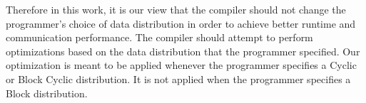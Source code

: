 Therefore in this work, it is our view that the compiler should not change the programmer's choice of data distribution in order to achieve better runtime and communication performance. The compiler should attempt to perform optimizations based on the data distribution that the programmer specified. Our optimization is meant to be applied whenever the programmer specifies a Cyclic or Block Cyclic distribution. It is not applied when the programmer specifies a Block distribution.